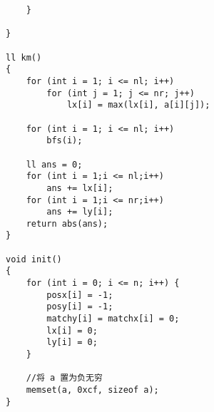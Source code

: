 \documentclass[twocolumn,a4]{article}
\begin{document}
\begin{lstlisting}
    }

}

ll km()
{
    for (int i = 1; i <= nl; i++)
        for (int j = 1; j <= nr; j++)
            lx[i] = max(lx[i], a[i][j]);

    for (int i = 1; i <= nl; i++)
        bfs(i);

    ll ans = 0;
    for (int i = 1;i <= nl;i++)
        ans += lx[i];
    for (int i = 1;i <= nr;i++)
        ans += ly[i];
    return abs(ans);
}

void init()
{
    for (int i = 0; i <= n; i++) {
        posx[i] = -1;
        posy[i] = -1;
        matchy[i] = matchx[i] = 0;
        lx[i] = 0;
        ly[i] = 0;
    }

    //将 a 置为负无穷
    memset(a, 0xcf, sizeof a);
}
\end{lstlisting}
\end{document}

